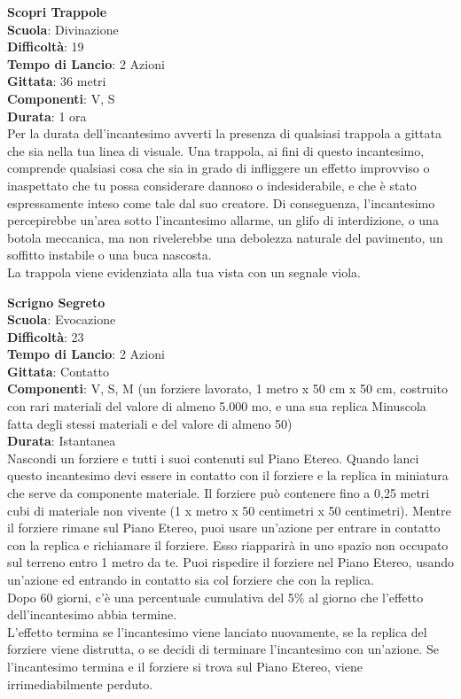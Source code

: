 \begin{multicols}{2}
\medskip\textbf{Scopri Trappole}\\
\textbf{Scuola}: Divinazione\\
\textbf{Difficoltà}: 19\\
\textbf{Tempo di Lancio}: 2 Azioni\\
\textbf{Gittata}: 36 metri\\
\textbf{Componenti}: V, S\\
\textbf{Durata}: 1 ora\\
Per la durata dell'incantesimo avverti la presenza di qualsiasi trappola a gittata che sia nella tua linea di visuale. Una trappola, ai fini di questo incantesimo, comprende qualsiasi cosa che sia in grado di infliggere un effetto improvviso o inaspettato che tu possa considerare dannoso o indesiderabile, e che è stato espressamente inteso come tale dal suo creatore. Di conseguenza, l'incantesimo percepirebbe un'area sotto l'incantesimo allarme, un glifo di interdizione, o una botola meccanica, ma non rivelerebbe una debolezza naturale del pavimento, un soffitto instabile o una buca nascosta.\\
La trappola viene evidenziata alla tua vista con un segnale viola.

\medskip\textbf{Scrigno Segreto}\\
\textbf{Scuola}: Evocazione\\
\textbf{Difficoltà}: 23\\
\textbf{Tempo di Lancio}: 2 Azioni\\
\textbf{Gittata}: Contatto\\
\textbf{Componenti}: V, S, M (un forziere lavorato, 1 metro x 50 cm x 50 cm, costruito con rari materiali del valore di almeno 5.000 mo, e una sua replica Minuscola fatta degli stessi materiali e del valore di almeno 50) \\
\textbf{Durata}: Istantanea\\
Nascondi un forziere e tutti i suoi contenuti sul Piano Etereo. Quando lanci questo incantesimo devi essere in contatto con il forziere e la replica in miniatura che serve da componente materiale. Il forziere può contenere fino a 0,25 metri cubi di materiale non vivente (1 x metro x 50 centimetri x 50 centimetri). Mentre il forziere rimane sul Piano Etereo, puoi usare un'azione per entrare in contatto con la replica e richiamare il forziere. Esso riapparirà in uno spazio non occupato sul terreno entro 1 metro da te. Puoi rispedire il forziere nel Piano Etereo, usando un'azione ed entrando in contatto sia col forziere che con la replica.\\
Dopo 60 giorni, c'è una percentuale cumulativa del 5\% al giorno che l'effetto dell'incantesimo abbia termine. \\
L'effetto termina se l'incantesimo viene lanciato nuovamente, se la replica del forziere viene distrutta, o se decidi di terminare l'incantesimo con un'azione. Se l'incantesimo termina e il forziere si trova sul Piano Etereo, viene irrimediabilmente perduto.


\end{multicols}
